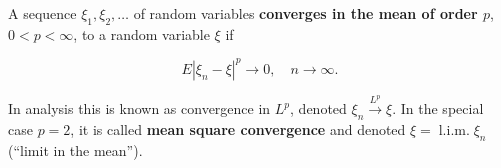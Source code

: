 A sequence $\xi_1, \xi_2, \ldots$ of random variables \textbf{converges in the mean of order $p$}, $0 < p < \infty$, to a random variable $\xi$ if

$$E|\xi_n - \xi|^p \to 0, \quad n \to \infty.$$

In analysis this is known as convergence in $L^p$, denoted $\xi_n \xrightarrow{L^p} \xi$. In the special case $p = 2$, it is called \textbf{mean square convergence} and denoted $\xi = \operatorname{l.i.m.} \xi_n$ (``limit in the mean'').
